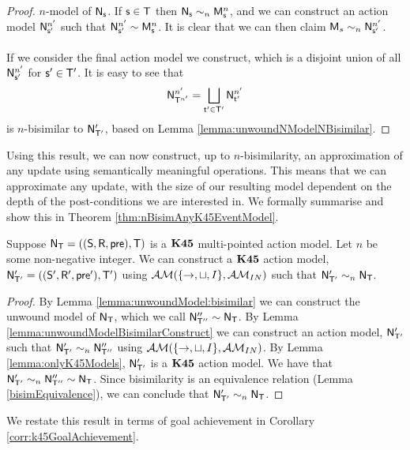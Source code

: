 \begin{proof}
	$n$-model of $\evM_\evs$.
	If $\evs \in \evT$ then $\evM_\evs \sim_n \evMM^{n}_\evs$, and we can construct an action model
	$\evM^{n'}_{\evs'}$ such that $\evM^{n'}_{\evs'} \sim \evMM^{n}_\evs$.
	It is clear that we can then claim $\evMM_s \sim_n \evM^{n'}_{\evs'}$.\\
	\\
	If we consider the final action model we construct, which is a disjoint union of all
	$\evM^{n'}_{\evs'}$ for $\evs' \in \evT'$.
	It is easy to see that
	\[
		\evM^{n'}_{\evT^{n'}} = \bigsqcup_{\evt' \in \evT'} \evM^{n'}_{\evt'}
	\]
	is $n$-bisimilar to $\evM'_{\evT'}$, based on Lemma \ref{lemma:unwoundNModelNBisimilar}.
\end{proof}

Using this result, we can now construct, up to $n$-bisimilarity, an
approximation of any update using semantically meaningful operations.
This means that we can approximate any update, with the size of our resulting
model dependent on the depth of the post-conditions we are interested in.
We formally summarise and show this in Theorem
\ref{thm:nBisimAnyK45EventModel}.

\begin{thm} \label{thm:nBisimAnyK45EventModel}
  Suppose $\evM_\evT = ((\evS,\evR,\evpr),\evT)$ is a $\AXKFF$ multi-pointed
  action model.
  Let $n$ be some non-negative integer.
  We can construct a $\AXKFF$ action model, $\evM'_{\evT'} =
  ((\evS',\evR',\evpr'),\evT')$ using
	$\EM(\{\to,\sqcup,I\}, \insaneClass)$ such that $\evM'_{\evT'} \sim_n \evM_\evT$.
\end{thm}
\begin{proof}
  By Lemma \ref{lemma:unwoundModel:bisimilar} we can construct the unwound model
  of $\evM_\evT$, which we call $\evM''_{\evT''} \sim \evM_{\evT}$.
	By Lemma \ref{lemma:unwoundModelBisimilarConstruct} we can construct an action model, $\evM'_{\evT'}$ such that
	$\evM'_{\evT'} \sim_n \evM''_{\evT''}$ using $\EM(\{\to,\sqcup,I\}, \insaneClass)$.
  By Lemma \ref{lemma:onlyK45Models}, $\evM'_{\evT'}$ is a $\AXKFF$ action model.
  We have that $\evM'_{\evT'} \sim_n \evM''_{\evT''} \sim \evM_\evT$.
	Since bisimilarity is an equivalence relation (Lemma \ref{bisimEquivalence}), we can conclude that
  $\evM'_{\evT'} \sim_n \evM_\evT$.
\end{proof}

We restate this result in terms of goal achievement in Corollary
\ref{corr:k45GoalAchievement}.

